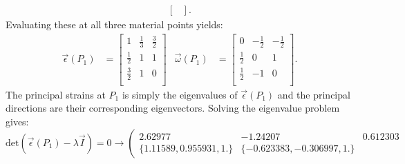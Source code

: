 \begin{derivation}
\begin{align*}
\begin{bmatrix}
      \end{bmatrix}
    .\end{align*}
    Evaluating these at all three material points yields:
    \begin{align*}
      \Vec{\epsilon}(P_1) &= \begin{bmatrix}
        1 & \frac{1}{3} & \frac{3}{2}\\
      \frac{1}{2} & 1 & 1\\
      \frac{3}{2} & 1 & 0\\
    \end{bmatrix} & \Vec{\omega}(P_1) &= \begin{bmatrix}
      0 & - \frac{1}{2} & - \frac{1}{2}\\
    \frac{1}{2} & 0 & 1 \\
    \frac{1}{2} & -1 & 0\\
    \end{bmatrix}
    .\end{align*}
    The principal strains at $P_1$ is simply the eigenvalues of $\Vec{\epsilon}(P_1)$ and the principal directions are their corresponding eigenvectors.
    Solving the eigenvalue problem gives:
    \begin{equation*}
      \mathrm{det}(\Vec{\epsilon}(P_1) - \lambda \Vec{I}) = 0  \rightarrow \left(
\begin{array}{ccc}
 2.62977 & -1.24207 & 0.612303 \\
 \{1.11589,0.955931,1.\} & \{-0.623383,-0.306997,1.\} &\
 

\end{array}
\end{equation*}
\end{derivation}
